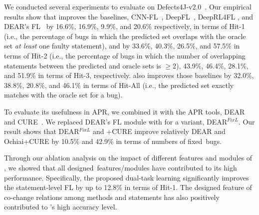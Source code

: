 We conducted several experiments to evaluate {\tool} on
Defects4J-v2.0~\cite{defects4j}. Our empirical results show that
{\tool} improves the baselines, CNN-FL~\cite{zhang2019cnn},
DeepFL~\cite{DeepFL}, DeepRL4FL \cite{icse21-fl}, and DEAR's
FL~\cite{icse22} by 16.6\%, 16.9\%, 9.9\%, and 20.6\% respectively, in
terms of Hit-1 (i.e., the percentage of bugs in which the predicted
set overlaps with the oracle set {\em at least} one faulty statement),
and by 33.6\%, 40.3\%, 26.5\%, and 57.5\% in terms of Hit-2 (i.e., the
percentage of bugs in which the number of overlapping statements
between the predicted and oracle sets is $\geq$2), 43.9\%, 46.4\%,
28.1\%, and 51.9\% in terms of Hit-3, respectively.
{\tool} also improves those baselines by 32.0\%, 38.8\%, 20.8\%, and
46.1\% in terms of Hit-All (i.e., the predicted set exactly matches
with the oracle set for a bug).
%
%

To evaluate its usefulness in APR, we combined it with the APR
tools, DEAR~\cite{icse22} and CURE~\cite{cure-icse21}. We replaced
DEAR's FL module with {\tool} for a variant, DEAR$^{FixL}$. Our result
shows that DEAR$^{FixL}$ and {\tool}+CURE improve relatively DEAR and
Ochiai+CURE by 10.5\% and 42.9\% in terms of numbers of fixed~bugs.



Through our ablation analysis on the impact of different features and
modules of {\tool}, we showed that all designed~features/modules have
contributed to its high performance. Specifically, the proposed
dual-task learning significantly improves the statement-level FL by up
to 12.8\% in terms of Hit-1. The designed feature of co-change
relations among methods and statements has also positively contributed
to {\tool}'s high accuracy level.


